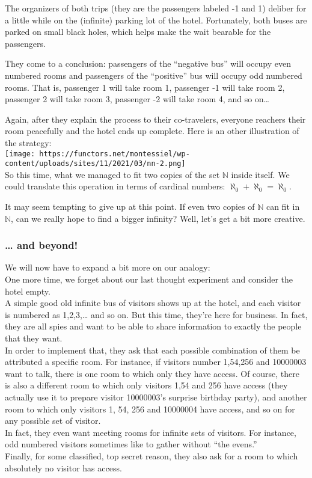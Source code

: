 \documentclass[
]{article}
\begin{document}
The organizers of both trips (they are the passengers labeled -1 and 1)
deliber for a little while on the (infinite) parking lot of the hotel.
Fortunately, both buses are parked on small black holes, which helps
make the wait bearable for the passengers.

They come to a conclusion: passengers of the ``negative bus'' will
occupy even numbered rooms and passengers of the ``positive'' bus will
occupy odd numbered rooms. That is, passenger 1 will take room 1,
passenger -1 will take room 2, passenger 2 will take room 3, passenger
-2 will take room 4, and so on\ldots{}

Again, after they explain the process to their co-travelers, everyone
reachers their room peacefully and the hotel ends up complete. Here is
an other illustration of the strategy:\\
\texttt{[image: https://functors.net/montessiel/wp-content/uploads/sites/11/2021/03/nn-2.png]}\\
So this time, what we managed to fit two copies of the set
\(\mathbb{N}\) inside itself. We could translate this operation in terms
of cardinal numbers: \(\aleph_0 + \aleph_0 = \aleph_0\).

It may seem tempting to give up at this point. If even two copies of
\(\mathbb{N}\) can fit in \(\mathbb{N}\), can we really hope to find a
bigger infinity? Well, let's get a bit more creative.

\hypertarget{and-beyond}{%
\subsubsection{\ldots{} and beyond!}\label{and-beyond}}

We will now have to expand a bit more on our analogy:\\
One more time, we forget about our last thought experiment and consider
the hotel empty.\\
A simple good old infinite bus of visitors shows up at the hotel, and
each visitor is numbered as 1,2,3,\ldots{} and so on. But this time,
they're here for business. In fact, they are all spies and want to be
able to share information to exactly the people that they want.\\
In order to implement that, they ask that each possible combination of
them be attributed a specific room. For instance, if visitors number
1,54,256 and 10000003 want to talk, there is one room to which only they
have access. Of course, there is also a different room to which only
visitors 1,54 and 256 have access (they actually use it to prepare
visitor 10000003's surprise birthday party), and another room to which
only visitors 1, 54, 256 and 10000004 have access, and so on for any
possible set of visitor.\\
In fact, they even want meeting rooms for infinite sets of visitors. For
instance, odd numbered visitors sometimes like to gather without ``the
evens.''\\
Finally, for some classified, top secret reason, they also ask for a
room to which absolutely no visitor has access.
\end{document}
